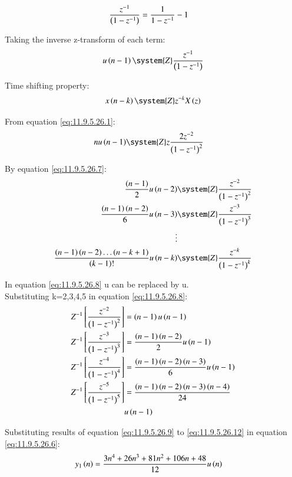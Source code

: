 \documentclass[journal,12pt,twocolumn]{IEEEtran}
\theoremstyle{remark}
\begin{document}
\begin{enumerate}[label=\arabic*.]
\begin{align}
    \frac{z^{-1}}{\left(1-z^{-1}\right)} &= \frac{1}{1-z^{-1}} -1
\end{align}

Taking the inverse z-transform of each term: 
\begin{align}
   u\brak{n-1}\system{Z} \frac{z^{-1}}{\brak{1-z^{-1}}}
\end{align}

Time shifting property:
\begin{align}
     x\brak{n-k}\system{Z} z^{-k}X\brak{z}\label{eq:11.9.5.26.7}
\end{align}

From equation \eqref{eq:11.9.5.26.1}:
\begin{align}
     nu\brak{n-1}&\system{Z} z\frac{2z^{-2}}{\brak{1-z^{-1}}^2}
\end{align}

By equation \eqref{eq:11.9.5.26.7}:
\begin{align}
     \frac{\brak{n-1}}{2}u\brak{n-2}&\system{Z} \frac{z^{-2}}{\brak{1-z^{-1}}^2} \\
     \frac{\brak{n-1}\brak{n-2}}{6}u\brak{n-3}&\system{Z} \frac{z^{-3}}{\brak{1-z^{-1}}^3}\\
     \vdots \notag \\
      \frac{\brak{n-1}\brak{n-2}\ldots \brak{n-k+1}}{\brak{k-1}!}u\brak{n-k}&\system{Z} \frac{z^{-k}}{\brak{1-z^{-1}}^k}\label{eq:11.9.5.26.8}
\end{align}

In equation \eqref{eq:11.9.5.26.8} u can be replaced by u.\\
Substituting k=2,3,4,5 in equation \eqref{eq:11.9.5.26.8}:
\begin{align}
     Z^{-1}\left[\frac{z^{-2}}{\left(1-z^{-1}\right)^2}\right]&=\left(n-1\right)u\left(n-1\right)\label{eq:11.9.5.26.9} \\
     Z^{-1}\left[\frac{z^{-3}}{\left(1-z^{-1}\right)^3}\right]&=\frac{\left(n-1\right)\left(n-2\right)}{2}u\left(n-1\right)\label{eq:11.9.5.26.10} \\
     Z^{-1}\left[\frac{z^{-4}}{\left(1-z^{-1}\right)^4}\right]&=\frac{\left(n-1\right)\left(n-2\right)\left(n-3\right)}{6}u\left(n-1\right)\label{eq:11.9.5.26.11} \\
     Z^{-1}\left[\frac{z^{-5}}{\left(1-z^{-1}\right)^5}\right]&=\frac{\left(n-1\right)\left(n-2\right)\left(n-3\right)\left(n-4\right)}{24}\label{eq:11.9.5.26.12}\\ &u\left(n-1\right) \notag 
\end{align}

Substituting results of equation \eqref{eq:11.9.5.26.9} to \eqref{eq:11.9.5.26.12} in equation \eqref{eq:11.9.5.26.6}:
\begin{align}
    y_1\left(n\right) &= \frac{3n^4 + 26n^3 + 81n^2 + 106n + 48}{12}u\left(n\right)
\end{align}


\end{enumerate}
\end{document}
